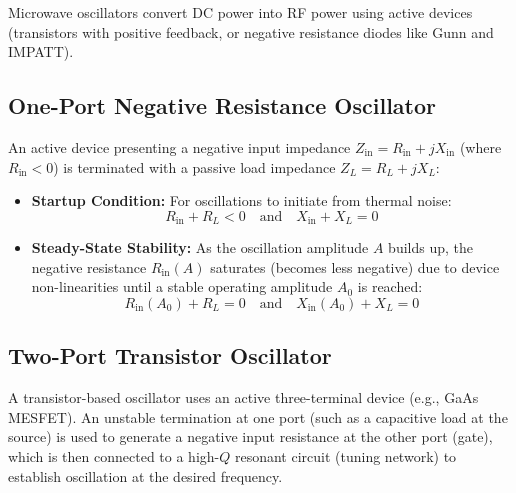 \documentclass[12pt,a4paper]{article}
\begin{document}
Microwave oscillators convert DC power into RF power using active devices (transistors with positive feedback, or negative resistance diodes like Gunn and IMPATT).

\subsection{One-Port Negative Resistance Oscillator}
An active device presenting a negative input impedance $Z_{\text{in}} = R_{\text{in}} + j X_{\text{in}}$ (where $R_{\text{in}} < 0$) is terminated with a passive load impedance $Z_L = R_L + j X_L$:
\begin{itemize}[leftmargin=*, itemsep=3pt]
  \item \textbf{Startup Condition:} For oscillations to initiate from thermal noise:
    \begin{equation}
      R_{\text{in}} + R_L < 0 \quad \text{and} \quad X_{\text{in}} + X_L = 0
    \end{equation}
  \item \textbf{Steady-State Stability:} As the oscillation amplitude $A$ builds up, the negative resistance $R_{\text{in}}(A)$ saturates (becomes less negative) due to device non-linearities until a stable operating amplitude $A_0$ is reached:
    \begin{equation}
      R_{\text{in}}(A_0) + R_L = 0 \quad \text{and} \quad X_{\text{in}}(A_0) + X_L = 0
    \end{equation}
\end{itemize}

\subsection{Two-Port Transistor Oscillator}
A transistor-based oscillator uses an active three-terminal device (e.g., GaAs MESFET). An unstable termination at one port (such as a capacitive load at the source) is used to generate a negative input resistance at the other port (gate), which is then connected to a high-$Q$ resonant circuit (tuning network) to establish oscillation at the desired frequency.
\end{document}
